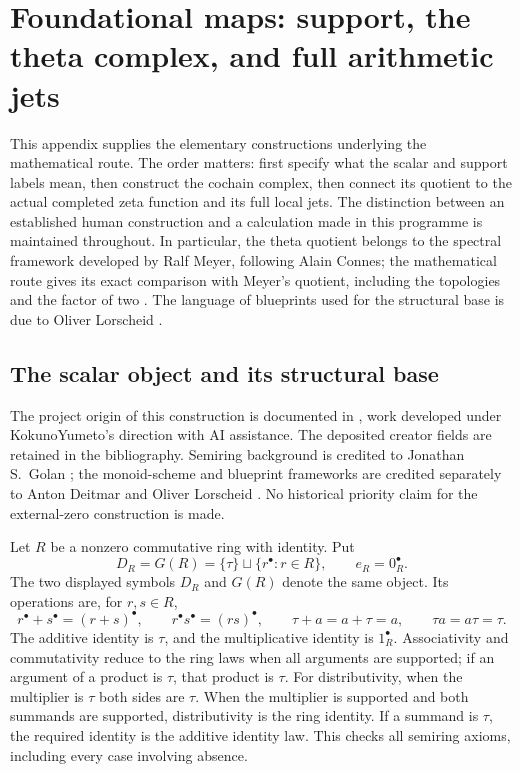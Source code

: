 \section{Foundational maps: support, the theta complex, and full arithmetic jets}
\label{app:foundational-maps}

This appendix supplies the elementary constructions underlying the
mathematical route. The order matters: first specify what the scalar and
support labels mean, then construct the cochain complex, then connect its
quotient to the actual completed zeta function and its full local jets.
The distinction between an established human construction and a calculation
made in this programme is maintained throughout. In particular, the theta
quotient belongs to the spectral framework developed by Ralf Meyer,
following Alain Connes; the mathematical route gives its exact comparison
with Meyer's quotient, including the topologies and the factor of two
\cite[\S\S2--4]{Meyer2005}.
The language of blueprints used for the structural base is due to
Oliver Lorscheid \cite{Lorscheid2012Blueprints}.

\subsection{The scalar object and its structural base}
\label{app:scalar-and-base}

The project origin of this construction is documented in
\cite{GlobalizationNote2026,SplitZeroSecondary2026}, work developed under
KokunoYumeto's direction with AI assistance. The deposited creator fields
are retained in the bibliography. Semiring background is credited to
Jonathan S.~Golan \cite{AuditGolan1999}; the monoid-scheme and blueprint
frameworks are credited separately to Anton Deitmar and Oliver Lorscheid
\cite{Deitmar2005,Lorscheid2012Blueprints}. No historical priority claim
for the external-zero construction is made.

Let \(R\) be a nonzero commutative ring with identity. Put
\[
D_R=G(R)=\{\tau\}\sqcup\{r^\bullet:r\in R\},
\qquad e_R=0_R^\bullet.
\]
The two displayed symbols \(D_R\) and \(G(R)\) denote the same object.
Its operations are, for \(r,s\in R\),
\[
r^\bullet+s^\bullet=(r+s)^\bullet,\qquad
r^\bullet s^\bullet=(rs)^\bullet,\qquad
\tau+a=a+\tau=a,\qquad \tau a=a\tau=\tau.
\]
The additive identity is \(\tau\), and the multiplicative identity is
\(1_R^\bullet\). Associativity and commutativity reduce to the ring laws
when all arguments are supported; if an argument of a product is
\(\tau\), that product is \(\tau\). For distributivity, when the
multiplier is \(\tau\) both sides are \(\tau\). When the multiplier is
supported and both summands are supported, distributivity is the ring
identity. If a summand is \(\tau\), the required identity is the additive
identity law. This checks all semiring axioms, including every case
involving absence.

